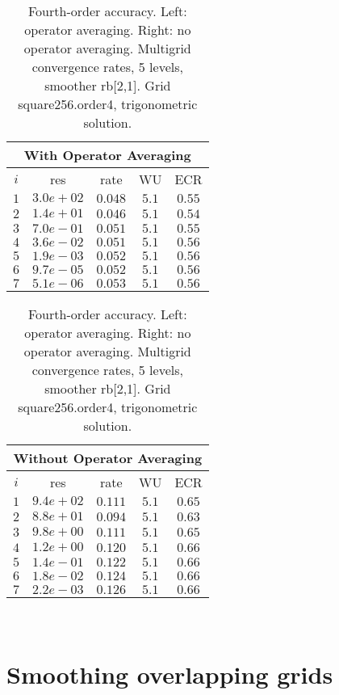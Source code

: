 \documentclass[11pt]{article}
\begin{document}
\begin{table}[hbt]
\begin{center}
\begin{tabular}{|c|c|c|c|c|} \hline 
 \multicolumn{5}{|c|}{With Operator Averaging}\\   \hline 
 $i$   & res      & rate    &  WU    & ECR  \\   \hline 
 $ 1$  & $ 3.0e+02$ & $0.048$ & $ 5.1$ & $0.55$ \\ 
 $ 2$  & $ 1.4e+01$ & $0.046$ & $ 5.1$ & $0.54$ \\ 
 $ 3$  & $ 7.0e-01$ & $0.051$ & $ 5.1$ & $0.55$ \\ 
 $ 4$  & $ 3.6e-02$ & $0.051$ & $ 5.1$ & $0.56$ \\ 
 $ 5$  & $ 1.9e-03$ & $0.052$ & $ 5.1$ & $0.56$ \\ 
 $ 6$  & $ 9.7e-05$ & $0.052$ & $ 5.1$ & $0.56$ \\ 
 $ 7$  & $ 5.1e-06$ & $0.053$ & $ 5.1$ & $0.56$ \\ 
\hline 
\end{tabular} \qquad
\begin{tabular}{|c|c|c|c|c|} \hline 
 \multicolumn{5}{|c|}{Without Operator Averaging}\\   \hline 
 $i$   & res      & rate    &  WU    & ECR  \\   \hline 
 $ 1$  & $ 9.4e+02$ & $0.111$ & $ 5.1$ & $0.65$ \\ 
 $ 2$  & $ 8.8e+01$ & $0.094$ & $ 5.1$ & $0.63$ \\ 
 $ 3$  & $ 9.8e+00$ & $0.111$ & $ 5.1$ & $0.65$ \\ 
 $ 4$  & $ 1.2e+00$ & $0.120$ & $ 5.1$ & $0.66$ \\ 
 $ 5$  & $ 1.4e-01$ & $0.122$ & $ 5.1$ & $0.66$ \\ 
 $ 6$  & $ 1.8e-02$ & $0.124$ & $ 5.1$ & $0.66$ \\ 
 $ 7$  & $ 2.2e-03$ & $0.126$ & $ 5.1$ & $0.66$ \\ 
\hline 
\end{tabular}\\
\end{center}
\caption{Fourth-order accuracy. Left: operator averaging. Right: no operator averaging. Multigrid convergence rates, 5 levels, smoother rb[2,1]. Grid square256.order4, trigonometric solution.}
\label{tab:operatorAveraging4} 
\end{table}


\section{Smoothing overlapping grids}
\end{document}
